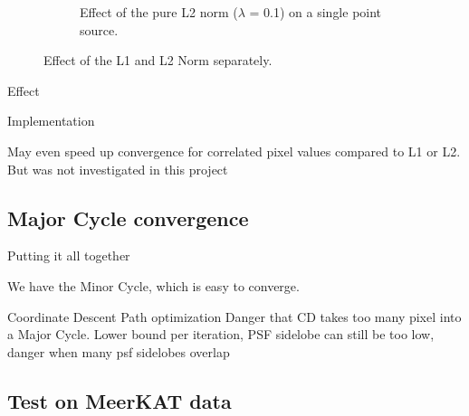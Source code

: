 \begin{figure}[h]
\begin{subfigure}[b]{0.3\linewidth}
		\caption{Effect of the pure L2 norm ($\lambda$ = 0.1) on a single point source.}
		\label{dist:cd:elastic:L2}
	\end{subfigure}
	
	\caption{Effect of the L1 and L2 Norm separately.}
	\label{dist:cd:elastic}
\end{figure}


Effect

Implementation



May even speed up convergence for correlated pixel values compared to L1 or L2\cite{friedman2010regularization}. But was not investigated in this project

\subsection{Major Cycle convergence}
Putting it all together

We have the Minor Cycle, which is easy to converge.

Coordinate Descent Path optimization \cite{friedman2010regularization}
Danger that CD takes too many pixel into a Major Cycle. Lower bound per iteration, PSF sidelobe
  can still be too low, danger when many psf sidelobes overlap

\subsection{Test on MeerKAT data}


